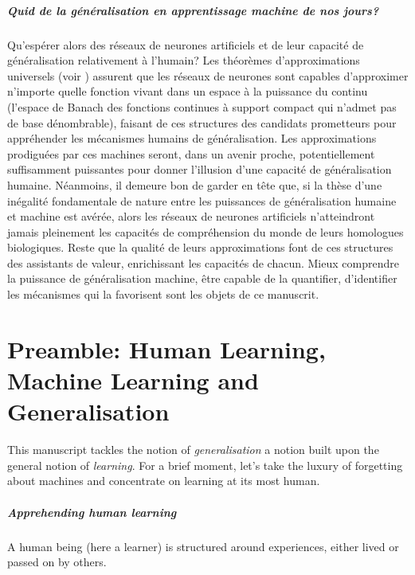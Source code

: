 \paragraph{Quid de la généralisation en apprentissage machine de nos jours?}
     Qu'espérer alors des réseaux de neurones artificiels et de leur capacité de généralisation relativement à l'humain? Les théorèmes d'approximations universels (voir \eg \citealp{lu2017expressive,park2021minimum}) assurent que les réseaux de neurones sont capables d'approximer n'importe quelle fonction vivant dans un espace à la puissance du continu (\eg l'espace de Banach des fonctions continues à support compact qui n'admet pas de base dénombrable), faisant de ces structures des candidats prometteurs pour appréhender les mécanismes humains de généralisation. 
    Les approximations prodiguées par ces machines seront, dans un avenir proche, potentiellement suffisamment puissantes pour donner l'illusion d'une capacité de généralisation humaine. Néanmoins, il demeure bon de garder en tête que, si la thèse d'une inégalité fondamentale de nature entre les puissances de généralisation humaine et machine est avérée, alors les réseaux de neurones artificiels n'atteindront jamais pleinement les capacités de compréhension du monde de leurs homologues biologiques. Reste que la qualité de leurs approximations font de ces structures des assistants de valeur, enrichissant les capacités de chacun.  Mieux comprendre la puissance de généralisation machine, être capable de la quantifier, d'identifier les mécanismes qui la favorisent sont les objets de ce manuscrit.  




\chapter*{Preamble: Human Learning, Machine Learning and Generalisation}
\mtcaddchapter



This manuscript tackles the notion of \emph{generalisation} a notion built upon the general notion of \emph{learning}. For a brief moment, let's take the luxury of forgetting about machines and concentrate on learning at its most human. 

\paragraph{Apprehending human learning} A human being (here a learner) is structured around experiences, either lived or passed on by others. 

